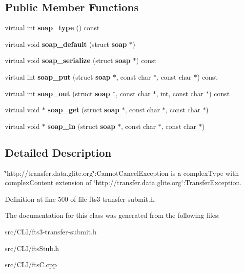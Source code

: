\subsection*{Public Member Functions}
\begin{DoxyCompactItemize}
\item 
virtual int {\bfseries soap\_\-type} () const \label{classtransfer____CannotCancelException_ab953cb376a836476fb23c9bf855401ff}

\item 
virtual void {\bfseries soap\_\-default} (struct {\bf soap} $\ast$)\label{classtransfer____CannotCancelException_a717c02200f3bfb47785935cb8fa8bf2b}

\item 
virtual void {\bfseries soap\_\-serialize} (struct {\bf soap} $\ast$) const \label{classtransfer____CannotCancelException_ac86bfb9ea965616548caaf04d533c5ad}

\item 
virtual int {\bfseries soap\_\-put} (struct {\bf soap} $\ast$, const char $\ast$, const char $\ast$) const \label{classtransfer____CannotCancelException_a69850bc3a5b33935700e2046815a0b4f}

\item 
virtual int {\bfseries soap\_\-out} (struct {\bf soap} $\ast$, const char $\ast$, int, const char $\ast$) const \label{classtransfer____CannotCancelException_aeebb2aa0681ea673fcba0ca672bf1563}

\item 
virtual void $\ast$ {\bfseries soap\_\-get} (struct {\bf soap} $\ast$, const char $\ast$, const char $\ast$)\label{classtransfer____CannotCancelException_a2b777f0e87d99d5ba1b872fbb0c30877}

\item 
virtual void $\ast$ {\bfseries soap\_\-in} (struct {\bf soap} $\ast$, const char $\ast$, const char $\ast$)\label{classtransfer____CannotCancelException_adb888139043e643b36e42b719dc293df}

\end{DoxyCompactItemize}


\subsection{Detailed Description}
\char`\"{}http://transfer.data.glite.org\char`\"{}:CannotCancelException is a complexType with complexContent extension of \char`\"{}http://transfer.data.glite.org\char`\"{}:TransferException. 

Definition at line 500 of file fts3-\/transfer-\/submit.h.



The documentation for this class was generated from the following files:\begin{DoxyCompactItemize}
\item 
src/CLI/fts3-\/transfer-\/submit.h\item 
src/CLI/ftsStub.h\item 
src/CLI/ftsC.cpp\end{DoxyCompactItemize}
